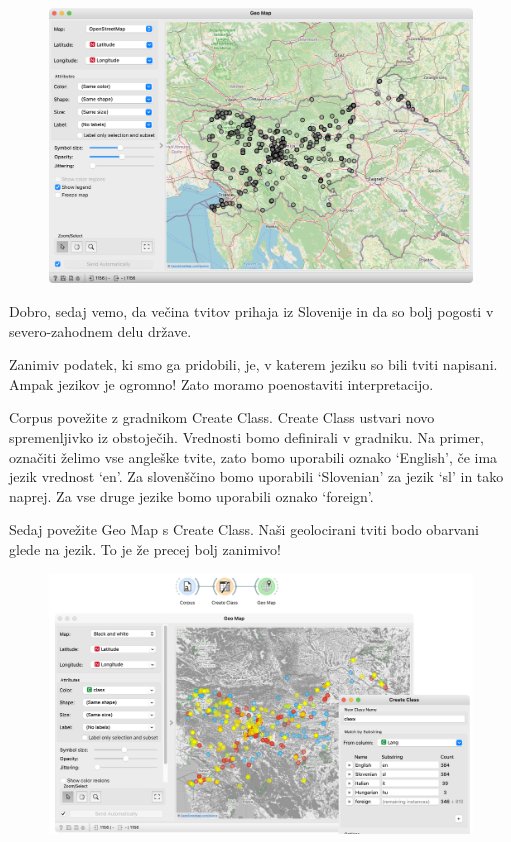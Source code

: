 \begin{figure}[h]
    \includegraphics[width=\linewidth]{geo1.png}%
    \caption{}
    \label{fig:012-geo1}
  \end{figure}

Dobro, sedaj vemo, da večina tvitov prihaja iz Slovenije in da so bolj pogosti v severo-zahodnem delu države.

Zanimiv podatek, ki smo ga pridobili, je, v katerem jeziku so bili tviti napisani. Ampak jezikov je ogromno! Zato moramo poenostaviti interpretacijo.

Corpus povežite z gradnikom Create Class. Create Class ustvari novo spremenljivko iz obstoječih. Vrednosti bomo definirali v gradniku. Na primer, označiti želimo vse angleške tvite, zato bomo uporabili oznako ‘English’, če ima jezik vrednost ‘en’. Za slovenščino bomo uporabili ‘Slovenian’ za jezik ‘sl’ in tako naprej. Za vse druge jezike bomo uporabili oznako ‘foreign’.

Sedaj povežite Geo Map s Create Class. Naši geolocirani tviti bodo obarvani glede na jezik. To je že precej bolj zanimivo!

\begin{figure}[h]
    \includegraphics[width=\linewidth]{geo2.png}%
    \caption{}
    \label{fig:012-geo2}
\end{figure}